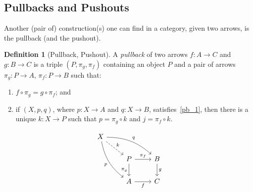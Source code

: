 \documentclass[a4paper, twoside,openright]{report}
\theoremstyle{plain}
\theoremstyle{definition}
\newtheorem{definition}[theorem]{Definition}
\begin{document}
\subsection{Pullbacks and Pushouts}

Another (pair of) construction(s) one can find in a category, given two arrows, is the pullback (and the pushout).

\begin{definition}[Pullback, Pushout]
        A \emph{pullback} of two arrows $f: A \rightarrow C$ and $g: B \rightarrow C$ is a triple $(P, \pi_g, \pi_f)$ containing an object $P$ and a pair of arrows $\pi_g: P \rightarrow A$, $\pi_f: P \rightarrow B$ such that:
        \begin{enumerate}
            \item\label{pb_1} $f \circ \pi_g = g \circ \pi_f$; and
            \item if $(X, p, q)$, where $p: X \rightarrow A$ and $q: X \rightarrow B$, satisfies~\ref{pb_1}, then there is a unique $k:X \rightarrow P$ such that $p = \pi_g \circ k$ and $j = \pi_f \circ k$.
        \end{enumerate}
        \[
        \begin{tikzcd}
        X \arrow[drr, bend left=20, "q"] \arrow[ddr, bend right=20,"p" swap] \arrow[dr, dashed, "k"] & & \\
        & P  \arrow[d, "{\pi_g}" swap] \arrow[r, "{\pi_f}"] & B \arrow[d, "g"] \\
        & A  \arrow[r, "f" swap] & C
        \end{tikzcd}
    \]


\end{definition}
\end{document}
